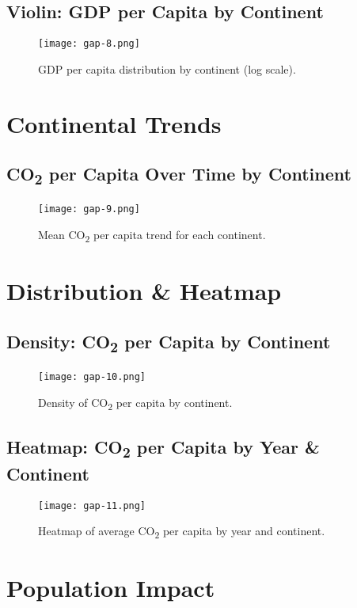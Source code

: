 \documentclass[11pt,a4paper]{article}
\begin{document}
\subsection{Violin: GDP per Capita by Continent}
\begin{figure}[H]
  \centering
  \texttt{[image: gap-8.png]}
  \caption{GDP per capita distribution by continent (log scale).}
  \label{fig:violin-gdp}
\end{figure}

\section{Continental Trends}
\subsection{CO\textsubscript{2} per Capita Over Time by Continent}
\begin{figure}[H]
  \centering
  \texttt{[image: gap-9.png]}
  \caption{Mean CO\textsubscript{2} per capita trend for each continent.}
  \label{fig:trend-cont}
\end{figure}

\section{Distribution \& Heatmap}
\subsection{Density: CO\textsubscript{2} per Capita by Continent}
\begin{figure}[H]
  \centering
  \texttt{[image: gap-10.png]}
  \caption{Density of CO\textsubscript{2} per capita by continent.}
  \label{fig:density}
\end{figure}

\subsection{Heatmap: CO\textsubscript{2} per Capita by Year \& Continent}
\begin{figure}[H]
  \centering
  \texttt{[image: gap-11.png]}
  \caption{Heatmap of average CO\textsubscript{2} per capita by year and continent.}
  \label{fig:heatmap}
\end{figure}

\section{Population Impact}
\end{document}
